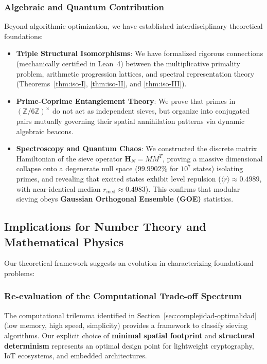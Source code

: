 \documentclass{article}
\numberwithin{equation}{section}
\theoremstyle{plain}
\theoremstyle{definition}
\begin{document}
\subsubsection{Algebraic and Quantum Contribution}

Beyond algorithmic optimization, we have established interdisciplinary theoretical foundations:

\begin{itemize}
    \item \textbf{Triple Structural Isomorphisms}: We have formalized rigorous connections (mechanically certified in Lean~4) between the multiplicative primality problem, arithmetic progression lattices, and spectral representation theory (Theorems~\ref{thm:iso-I}, \ref{thm:iso-II}, and \ref{thm:iso-III}).
    \item \textbf{Prime-Coprime Entanglement Theory}: We prove that primes in $(\mathbb{Z}/6\mathbb{Z})^\times$ do not act as independent sieves, but organize into conjugated pairs mutually governing their spatial annihilation patterns via dynamic algebraic beacons.
    \item \textbf{Spectroscopy and Quantum Chaos}: We constructed the discrete matrix Hamiltonian of the sieve operator $\mathbf{H}_N = M M^T$, proving a massive dimensional collapse onto a degenerate null space ($99.9902\%$ for $10^7$ states) isolating primes, and revealing that excited states exhibit level repulsion ($\langle r \rangle \approx 0.4989$, with near-identical median $r_{\text{med}} \approx 0.4983$). This confirms that modular sieving obeys \textbf{Gaussian Orthogonal Ensemble (GOE)} statistics.
\end{itemize}

\subsection{Implications for Number Theory and Mathematical Physics}

Our theoretical framework suggests an evolution in characterizing foundational problems:

\subsubsection{Re-evaluation of the Computational Trade-off Spectrum}

The computational trilemma identified in Section~\ref{sec:complejidad-optimalidad} (low memory, high speed, simplicity) provides a framework to classify sieving algorithms. Our explicit choice of \textbf{minimal spatial footprint} and \textbf{structural determinism} represents an optimal design point for lightweight cryptography, IoT ecosystems, and embedded architectures.
\end{document}
